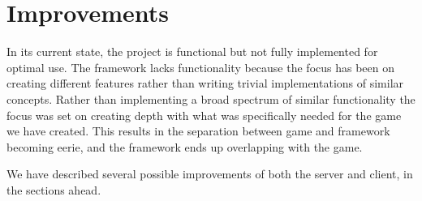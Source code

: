 \section{Improvements}

In its current state, the project is functional but not fully implemented for optimal use. The framework lacks functionality because the focus has been on creating different features rather than writing trivial implementations of similar concepts. Rather than implementing a broad spectrum of similar functionality the focus was set on creating depth with what was specifically needed for the game we have created. This results in the separation between game and framework becoming eerie, and the framework ends up overlapping with the game.

We have described several possible improvements of both the server and client, in the sections ahead.

%

